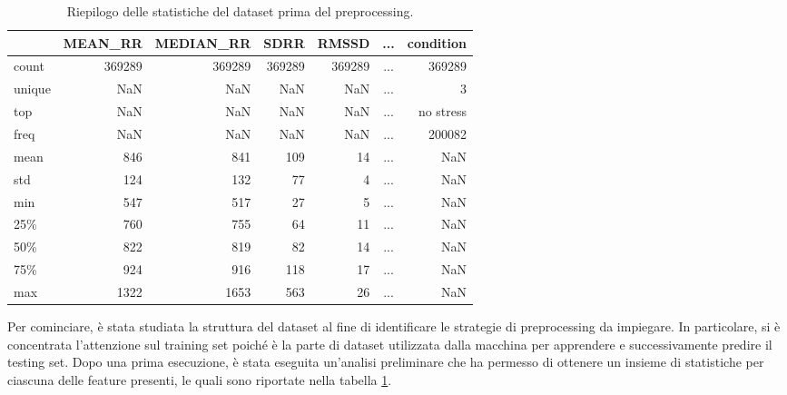 \begin{table}[t]
    \centering
    \begin{tabular}{|lrrrrcr|}
        \hline
        & \textbf{MEAN\_RR}
        & \textbf{MEDIAN\_RR}
        & \textbf{SDRR}
        & \textbf{RMSSD}
        & ...
        & \textbf{condition} \\
        \hline        
        count
        & 369289
        & 369289
        & 369289
        & 369289
        & ...
        & 369289 \\
        unique
        & NaN
        & NaN
        & NaN
        & NaN
        & ...
        & 3 \\
        top
        & NaN
        & NaN
        & NaN
        & NaN
        & ...
        & no stress \\
        freq
        & NaN
        & NaN
        & NaN
        & NaN
        & ...
        & 200082 \\
        mean
        & 846
        & 841
        & 109
        & 14
        & ...
        & NaN \\
        std
        & 124
        & 132
        & 77
        & 4
        & ...
        & NaN \\        
        min
        & 547
        & 517
        & 27
        & 5
        & ...
        & NaN \\        
        25\%
        & 760
        & 755
        & 64
        & 11
        & ...
        & NaN \\
        50\%
        & 822
        & 819
        & 82
        & 14
        & ...
        & NaN \\
        75\%
        & 924
        & 916
        & 118
        & 17
        & ...
        & NaN \\
        max
        & 1322
        & 1653
        & 563
        & 26
        & ...
        & NaN \\
        \hline
    \end{tabular}
    \caption{Riepilogo delle statistiche del dataset prima del preprocessing.}
    \label{tab:6-1}
\end{table}

Per cominciare, è stata studiata la struttura del dataset al fine di identificare le strategie di preprocessing da impiegare. In particolare, si è concentrata l'attenzione sul training set poiché è la parte di dataset utilizzata dalla macchina per apprendere e successivamente predire il testing set. Dopo una prima esecuzione, è stata eseguita un'analisi preliminare che ha permesso di ottenere un insieme di statistiche per ciascuna delle feature presenti, le quali sono riportate nella tabella \ref{tab:6-1}.

